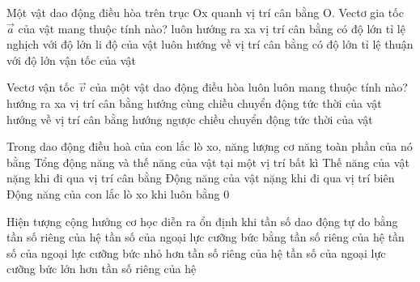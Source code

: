 \begin{ex}%
	Một vật dao động điều hòa trên trục Ox quanh vị trí cân bằng O. Vectơ gia tốc $\vec{a}$ của vật mang thuộc tính nào?
	\choice
	{luôn hướng ra xa vị trí cân bằng}
	{có độ lớn tỉ lệ nghịch với độ lớn li độ của vật}
	{\True luôn hướng về vị trí cân bằng}
	{có độ lớn tỉ lệ thuận với độ lớn vận tốc của vật}
\end{ex}

\begin{ex}%
	Vectơ vận tốc $\vec{v}$ của một vật dao động điều hòa luôn luôn mang thuộc tính nào?
	\choice
	{hướng ra xa vị trí cân bằng}
	{\True hướng cùng chiều chuyển động tức thời của vật}
	{hướng về vị trí cân bằng}
	{hướng ngược chiều chuyển động tức thời của vật}
\end{ex}

\begin{ex}%
	Trong dao động điều hoà của con lắc lò xo, năng lượng cơ năng toàn phần của nó bằng
	\choice
	{\True Tổng động năng và thế năng của vật tại một vị trí bất kì}
	{Thế năng của vật nặng khi đi qua vị trí cân bằng}
	{Động năng của vật nặng khi đi qua vị trí biên}
	{Động năng của con lắc lò xo khi luôn bằng 0}
\end{ex}
\begin{ex}%
	Hiện tượng cộng hưởng cơ học diễn ra ổn định khi
	\choice
	{tần số dao động tự do bằng tần số riêng của hệ}
	{\True tần số của ngoại lực cưỡng bức bằng tần số riêng của hệ}
	{tần số của ngoại lực cưỡng bức nhỏ hơn tần số riêng của hệ}
	{tần số của ngoại lực cưỡng bức lớn hơn tần số riêng của hệ}
\end{ex}

